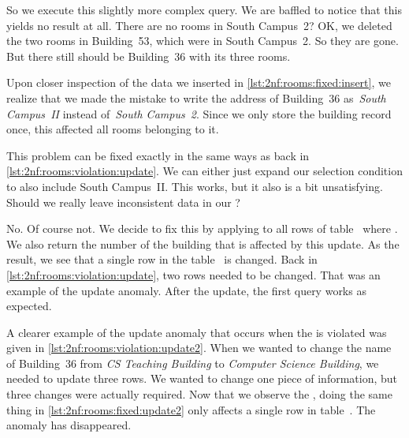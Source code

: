 So we execute this slightly more complex query.
We are baffled to notice that this yields no result at all.
There are no rooms in South Campus~2?
OK, we deleted the two rooms in Building~53, which were in South Campus~2.
So they are gone.
But there still should be Building~36 with its three rooms.

Upon closer inspection of the data we inserted in \cref{lst:2nf:rooms:fixed:insert}, we realize that we made the mistake to write the address of Building~36 as~\emph{South Campus~II} instead of~\emph{South Campus~2}.
Since we only store the building record once, this affected all rooms belonging to it.

This problem can be fixed exactly in the same ways as back in \cref{lst:2nf:rooms:violation:update}.
We can either just expand our selection condition to also include South Campus~II.
This works, but it also is a bit unsatisfying.
Should we really leave inconsistent data in our \db?

No.
Of course not.
We decide to fix this by applying  to all rows of table~ where .
We also return the number of the building that is affected by this update.
As the result, we see that a single row in the table~ is changed.
Back in \cref{lst:2nf:rooms:violation:update}, two rows needed to be changed.
That was an example of the update anomaly.
After the update, the first query works as expected.

A clearer example of the update anomaly that occurs when the  is violated was given in \cref{lst:2nf:rooms:violation:update2}.
When we wanted to change the name of Building~36 from \emph{CS Teaching Building} to \emph{Computer Science Building}, we needed to update three rows.
We wanted to change one piece of information, but three changes were actually required.
Now that we observe the , doing the same thing in \cref{lst:2nf:rooms:fixed:update2} only affects a single row in table~.
The anomaly has disappeared.%
%
\FloatBarrier%
\endhsection%
%
